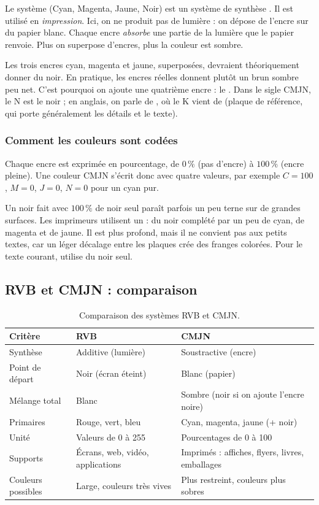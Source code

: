 Le système  (Cyan, Magenta, Jaune, Noir) est un système de synthèse . Il est utilisé en \emph{impression}. Ici, on ne produit pas de lumière : on dépose de l'encre sur du papier blanc. Chaque encre \emph{absorbe} une partie de la lumière que le papier renvoie. Plus on superpose d'encres, plus la couleur est sombre.

Les trois encres cyan, magenta et jaune, superposées, devraient théoriquement donner du noir. En pratique, les encres réelles donnent plutôt un brun sombre peu net. C'est pourquoi on ajoute une quatrième encre : le . Dans le sigle CMJN, le N est le noir ; en anglais, on parle de , où le K vient de  (plaque de référence, qui porte généralement les détails et le texte).

\subsubsection{Comment les couleurs sont codées}

Chaque encre est exprimée en pourcentage, de $0\,\%$ (pas d'encre) à $100\,\%$ (encre pleine). Une couleur CMJN s'écrit donc avec quatre valeurs, par exemple $C=100$, $M=0$, $J=0$, $N=0$ pour un cyan pur.

\begin{defbox}
Un noir fait avec $100\,\%$ de noir seul paraît parfois un peu terne sur de grandes surfaces. Les imprimeurs utilisent un  : du noir complété par un peu de cyan, de magenta et de jaune. Il est plus profond, mais il ne convient pas aux petits textes, car un léger décalage entre les plaques crée des franges colorées. Pour le texte courant, utilise du noir seul.
\end{defbox}

\subsection{RVB et CMJN : comparaison}

\begin{table}[h!]
\centering
\begin{tabular}{@{}p{3.2cm}p{5.6cm}p{5.6cm}@{}}
\toprule
\textbf{Critère} & \textbf{RVB} & \textbf{CMJN} \\
\midrule
Synthèse & Additive (lumière) & Soustractive (encre) \\
Point de départ & Noir (écran éteint) & Blanc (papier) \\
Mélange total & Blanc & Sombre (noir si on ajoute l'encre noire) \\
Primaires & Rouge, vert, bleu & Cyan, magenta, jaune (+ noir) \\
Unité & Valeurs de 0 à 255 & Pourcentages de 0 à 100 \\
Supports & Écrans, web, vidéo, applications & Imprimés : affiches, flyers, livres, emballages \\
Couleurs possibles & Large, couleurs très vives & Plus restreint, couleurs plus sobres \\
\bottomrule
\end{tabular}
\caption{Comparaison des systèmes RVB et CMJN.}
\end{table}

